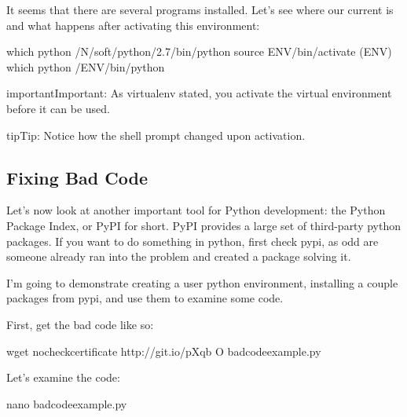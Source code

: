 It seems that there are several programs installed.  Let's see where
our current  is and what happens after activating this
environment:

\begin{sphinxVerbatim}[commandchars=\\\{\}]
\PYGZdl{} which python
/N/soft/python/2.7/bin/python
\PYGZdl{} source ENV/bin/activate
(ENV) \PYGZdl{} which python
\PYGZti{}/ENV/bin/python
\end{sphinxVerbatim}

\begin{sphinxadmonition}{important}{Important:}
As virtualenv stated, you  activate the virtual environment
before it can be used.
\end{sphinxadmonition}

\begin{sphinxadmonition}{tip}{Tip:}
Notice how the shell prompt changed upon activation.
\end{sphinxadmonition}


\subsection{Fixing Bad Code}
\label{\detokenize{lesson/prg/python_intro:fixing-bad-code}}
Let's now look at another important tool for Python development: the
Python Package Index, or PyPI for short.  PyPI provides a large set of
third-party python packages.  If you want to do something in python,
first check pypi, as odd are someone already ran into the problem and
created a package solving it.

I'm going to demonstrate creating a user python environment,
installing a couple packages from pypi, and use them to examine some
code.

First, get the bad code like so:

\begin{sphinxVerbatim}[commandchars=\\\{\}]
\PYGZdl{} wget \PYGZhy{}\PYGZhy{}no\PYGZhy{}check\PYGZhy{}certificate http://git.io/pXqb \PYGZhy{}O bad\PYGZus{}code\PYGZus{}example.py
\end{sphinxVerbatim}

Let's examine the code:

\begin{sphinxVerbatim}[commandchars=\\\{\}]
\PYGZdl{} nano bad\PYGZus{}code\PYGZus{}example.py
\end{sphinxVerbatim}

